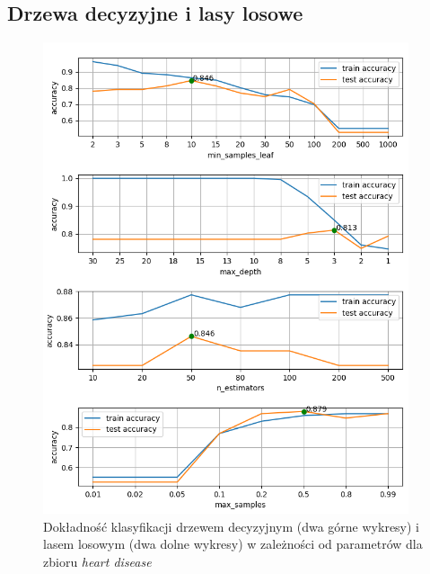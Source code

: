 \documentclass{classrep}
\begin{document}
{        \subsection{Drzewa decyzyjne i lasy losowe}
        \label{drzewa_decyzyjne_results} {
            \begin{figure}[h]
                \centering
                \includegraphics[width=0.96\textwidth]{img/mum_trees_1.png}
                \caption{Dokładność klasyfikacji drzewem decyzyjnym (dwa górne wykresy) i lasem losowym (dwa dolne wykresy) w zależności od parametrów dla zbioru \emph{heart disease}}
                \label{trees_hearts}
            \end{figure}
            \begin{figure}[h]
                \centering

\end{figure}}}
\end{document}
